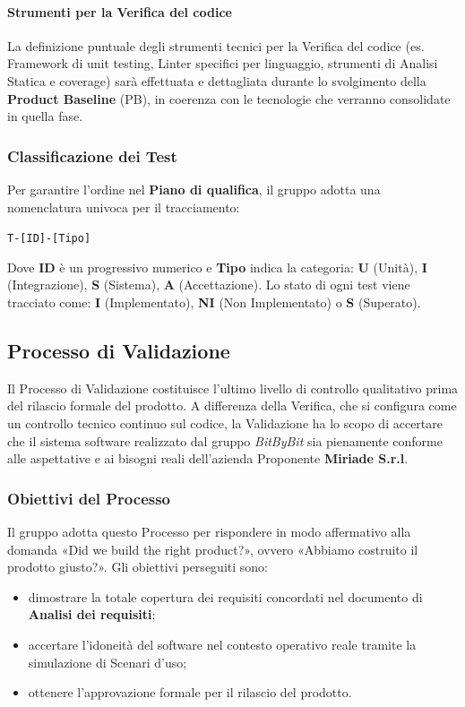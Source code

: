 \documentclass[a4paper,12pt]{article}
\newcommand{\ignoreglossary}{}
\begin{document}
\paragraph{Strumenti per la \ignoreglossary{Verifica} del codice}
La definizione puntuale degli strumenti tecnici per la Verifica del codice (es. Framework di unit testing, Linter specifici per linguaggio, strumenti di Analisi Statica e coverage) sarà effettuata e dettagliata durante lo svolgimento della \textbf{Product Baseline} (PB), in coerenza con le tecnologie che verranno consolidate in quella fase.

\subsubsection{Classificazione dei Test}
Per garantire l'ordine nel \textbf{Piano di qualifica}, il gruppo adotta una nomenclatura univoca per il tracciamento:
\begin{center}
    \texttt{T-[ID]-[Tipo]}
\end{center}
Dove \textbf{ID} è un progressivo numerico e \textbf{Tipo} indica la categoria: \textbf{U} (Unità), \textbf{I} (Integrazione), \textbf{S} (Sistema), \textbf{A} (Accettazione).
Lo stato di ogni test viene tracciato come: \textbf{I} (Implementato), \textbf{NI} (Non Implementato) o \textbf{S} (Superato).

\subsection{Processo di Validazione}
Il Processo di Validazione costituisce l'ultimo livello di controllo qualitativo prima del rilascio formale del prodotto.
A differenza della Verifica, che si configura come un controllo tecnico continuo sul codice, la Validazione ha lo scopo di accertare che il sistema software realizzato dal gruppo \textit{BitByBit} sia pienamente conforme alle aspettative e ai bisogni reali dell'azienda Proponente \textbf{Miriade S.r.l}.

\subsubsection{Obiettivi del Processo}
Il gruppo adotta questo Processo per rispondere in modo affermativo alla domanda «Did we build the right product?», ovvero «Abbiamo costruito il prodotto giusto?».
Gli obiettivi perseguiti sono:
\begin{itemize}
    \item dimostrare la totale copertura dei requisiti concordati nel documento di \textbf{Analisi dei requisiti};
    \item accertare l'idoneità del software nel contesto operativo reale tramite la simulazione di Scenari d'uso;
    \item ottenere l'approvazione formale per il rilascio del prodotto.
\end{itemize}
\end{document}
